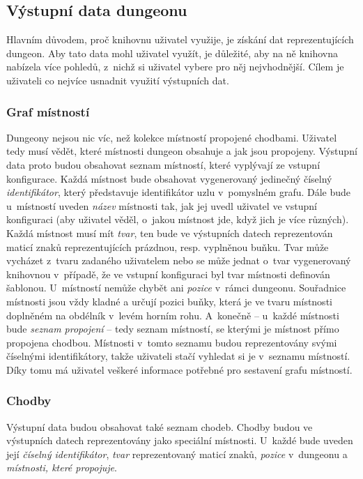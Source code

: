 \subsection{Výstupní data dungeonu}

Hlavním důvodem, proč knihovnu uživatel využije, je získání dat reprezentujících dungeon.
Aby tato data mohl uživatel využít, je důležité, aby na ně knihovna nabízela více pohledů, z~nichž si uživatel vybere pro něj nejvhodnější.
Cílem je uživateli co nejvíce usnadnit využití výstupních dat.

\subsubsection{Graf místností}
Dungeony nejsou nic víc, než kolekce místností propojené chodbami.
Uživatel tedy musí vědět, které místnosti dungeon obsahuje a jak jsou propojeny.
Výstupní data proto budou obsahovat seznam místností, které vyplývají ze vstupní konfigurace.
Každá místnost bude obsahovat vygenerovaný jedinečný číselný \textit{identifikátor}, který představuje identifikátor uzlu v~pomyslném grafu.
Dále bude u~místností uveden \textit{název} místnosti tak, jak jej uvedl uživatel ve vstupní konfiguraci (aby uživatel věděl, o~jakou místnost jde, když jich je více různých).
Každá místnost musí mít \textit{tvar}, ten bude ve výstupních datech reprezentován maticí znaků reprezentujících prázdnou, resp. vyplněnou buňku.
Tvar může vycházet z~tvaru zadaného uživatelem nebo se může jednat o~tvar vygenerovaný knihovnou v~případě, že ve vstupní konfiguraci byl tvar místnosti definován šablonou.
U~místností nemůže chybět ani \textit{pozice} v~rámci dungeonu.
Souřadnice místnosti jsou vždy kladné a určují pozici buňky, která je ve tvaru místnosti doplněném na obdélník v~levém horním rohu.
A~konečně -- u~každé místnosti bude \textit{seznam propojení} -- tedy seznam místností, se kterými je místnost přímo propojena chodbou.
Místnosti v~tomto seznamu budou reprezentovány svými číselnými identifikátory, takže uživateli stačí vyhledat si je v~seznamu místností.
Díky tomu má uživatel veškeré informace potřebné pro sestavení grafu místností.

\subsubsection{Chodby}
Výstupní data budou obsahovat také seznam chodeb.
Chodby budou ve výstupních datech reprezentovány jako speciální místnosti.
U~každé bude uveden její \textit{číselný identifikátor}, \textit{tvar} reprezentovaný maticí znaků, \textit{pozice} v~dungeonu a \textit{místnosti, které propojuje}.

